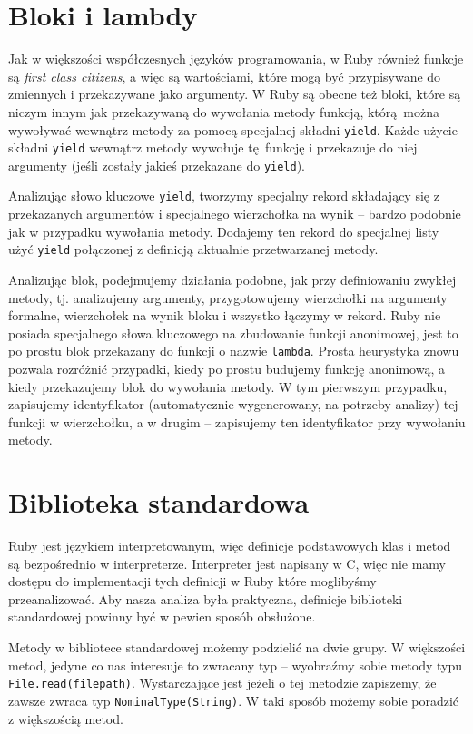 \documentclass[shortabstract,mgr]{iithesis}
\begin{document}
\section{Bloki i lambdy}

Jak w większości współczesnych języków programowania, w Ruby również funkcje są \textit{first class citizens}, a więc są wartościami, które mogą być przypisywane do zmiennych i przekazywane jako argumenty. W Ruby są obecne też bloki, które są niczym innym jak przekazywaną do wywołania metody funkcją, którą można wywoływać wewnątrz metody za pomocą specjalnej składni \texttt{yield}. Każde użycie składni \texttt{yield} wewnątrz metody wywołuje tę funkcję i przekazuje do niej argumenty (jeśli zostały jakieś przekazane do \texttt{yield}).

Analizując słowo kluczowe \texttt{yield}, tworzymy specjalny rekord składający się z przekazanych argumentów i specjalnego wierzchołka na wynik -- bardzo podobnie jak w przypadku wywołania metody. Dodajemy ten rekord do specjalnej listy użyć \texttt{yield} połączonej z definicją aktualnie przetwarzanej metody.

Analizując blok, podejmujemy działania podobne, jak przy definiowaniu zwykłej metody, tj. analizujemy argumenty, przygotowujemy wierzchołki na argumenty formalne, wierzchołek na wynik bloku i wszystko łączymy w rekord. Ruby nie posiada specjalnego słowa kluczowego na zbudowanie funkcji anonimowej, jest to po prostu blok przekazany do funkcji o nazwie \texttt{lambda}. Prosta heurystyka znowu pozwala rozróżnić przypadki, kiedy po prostu budujemy funkcję anonimową, a kiedy przekazujemy blok do wywołania metody. W tym pierwszym przypadku, zapisujemy identyfikator (automatycznie wygenerowany, na potrzeby analizy) tej funkcji w wierzchołku, a w drugim -- zapisujemy ten identyfikator przy wywołaniu metody.


\section{Biblioteka standardowa}

Ruby jest językiem interpretowanym, więc definicje podstawowych klas i metod są bezpośrednio w interpreterze. Interpreter jest napisany w C, więc nie mamy dostępu do implementacji tych definicji w Ruby które moglibyśmy przeanalizować. Aby nasza analiza była praktyczna, definicje biblioteki standardowej powinny być w pewien sposób obsłużone.

Metody w bibliotece standardowej możemy podzielić na dwie grupy. W większości metod, jedyne co nas interesuje to zwracany typ -- wyobraźmy sobie metody typu \texttt{File.read(filepath)}. Wystarczające jest jeżeli o tej metodzie zapiszemy, że zawsze zwraca typ \texttt{NominalType(String)}. W taki sposób możemy sobie poradzić z większością metod.
\end{document}
